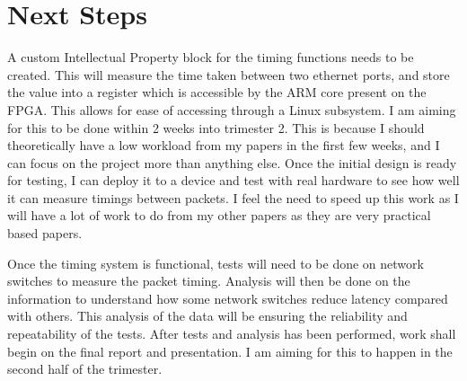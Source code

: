 \chapter{Next Steps}\label{C:nextSteps}

\par A custom Intellectual Property block for the timing functions needs to be created. This will measure the time taken between two ethernet ports, and store the value into a register which is accessible by the ARM core present on the FPGA. This allows for ease of accessing through a Linux subsystem.
I am aiming for this to be done within 2 weeks into trimester 2. This is because I should theoretically have a low workload from my papers in the first few weeks, and I can focus on the project more than anything else.
Once the initial design is ready for testing, I can deploy it to a device and test with real hardware to see how well it can measure timings between packets.
I feel the need to speed up this work as I will have a lot of work to do from my other papers as they are very practical based papers.

\par Once the timing system is functional, tests will need to be done on network switches to measure the packet timing.
Analysis will then be done on the information to understand how some network switches reduce latency compared with others. 
This analysis of the data will be ensuring the reliability and repeatability of the tests. 
After tests and analysis has been performed, work shall begin on the final report and presentation.
I am aiming for this to happen in the second half of the trimester.
